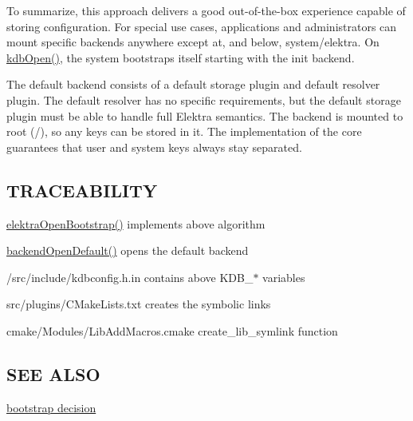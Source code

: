 To summarize, this approach delivers a good out-\/of-\/the-\/box experience capable of storing configuration. For special use cases, applications and administrators can mount specific backends anywhere except at, and below, {\ttfamily system/elektra}. On {\ttfamily \hyperlink{group__kdb_ga6808defe5870f328dd17910aacbdc6ca}{kdb\+Open()}}, the system bootstraps itself starting with the init backend.

The default backend consists of a default storage plugin and default resolver plugin. The default resolver has no specific requirements, but the default storage plugin must be able to handle full Elektra semantics. The backend is mounted to root ({\ttfamily /}), so any keys can be stored in it. The implementation of the core guarantees that user and system keys always stay separated.

\subsection*{T\+R\+A\+C\+E\+A\+B\+I\+L\+I\+TY}


\begin{DoxyItemize}
\item {\ttfamily \hyperlink{group__kdb_ga5bfaad0230457cd6386032fe65c41576}{elektra\+Open\+Bootstrap()}} implements above algorithm
\item {\ttfamily \hyperlink{backend_8c_a5227608d302910f25fc3a5c8968ab542}{backend\+Open\+Default()}} opens the default backend
\item {\ttfamily /src/include/kdbconfig.h.\+in} contains above {\ttfamily K\+D\+B\+\_\+$\ast$} variables
\item {\ttfamily src/plugins/\+C\+Make\+Lists.\+txt} creates the symbolic links
\item {\ttfamily cmake/\+Modules/\+Lib\+Add\+Macros.\+cmake} {\ttfamily create\+\_\+lib\+\_\+symlink} function
\end{DoxyItemize}

\subsection*{S\+EE A\+L\+SO}


\begin{DoxyItemize}
\item \hyperlink{doc_decisions_bootstrap_md}{bootstrap decision} 
\end{DoxyItemize}